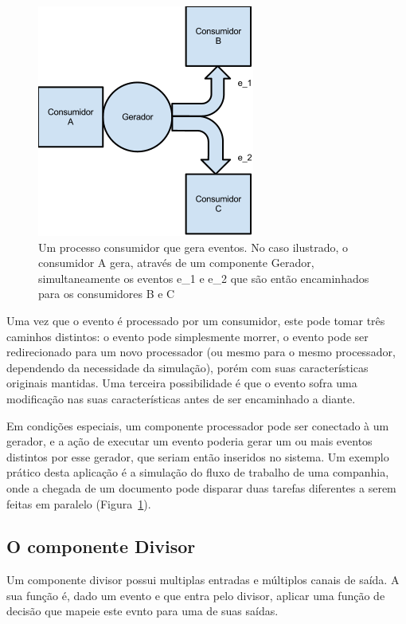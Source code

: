 \begin{figure}
  \centerline{\includegraphics{gerador_mais_consumidor.png}}
  \caption{Um processo consumidor que gera eventos. No caso ilustrado, o consumidor A gera, através de um componente Gerador, simultaneamente os eventos e\_1 e e\_2 que são então encaminhados para os consumidores B e C}
\label{fig:multiple_sons}
\end{figure}

Uma vez que o evento é processado por um consumidor, este pode tomar três caminhos distintos: o evento pode simplesmente morrer, o evento pode ser redirecionado para um novo processador (ou mesmo para o mesmo processador, dependendo da necessidade da simulação), porém com suas características originais mantidas. Uma terceira possibilidade é que o evento sofra uma modificação nas suas características antes de ser encaminhado a diante.

Em condições especiais, um componente processador pode ser conectado à um gerador, e a ação de executar um evento poderia gerar um ou mais eventos distintos por esse gerador, que seriam então inseridos no sistema. Um exemplo prático desta aplicação é a simulação do fluxo de trabalho de uma companhia, onde a chegada de um documento pode disparar duas tarefas diferentes a serem feitas em paralelo (Figura~\ref{fig:multiple_sons}).


\subsection{O componente Divisor \label{divisor}}

Um componente divisor possui multiplas entradas e múltiplos canais de saída. A sua função é, dado um evento e que entra pelo divisor, aplicar uma função de decisão que mapeie este evnto para uma de suas saídas.

